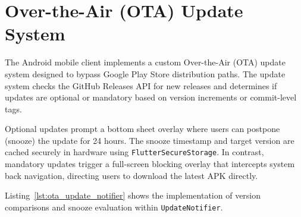 \section{Over-the-Air (OTA) Update System}
The Android mobile client implements a custom Over-the-Air (OTA) update system designed to bypass Google Play Store distribution paths. The update system checks the GitHub Releases API for new releases and determines if updates are optional or mandatory based on version increments or commit-level tags.

Optional updates prompt a bottom sheet overlay where users can postpone (snooze) the update for 24 hours. The snooze timestamp and target version are cached securely in hardware using \texttt{FlutterSecureStorage}. In contrast, mandatory updates trigger a full-screen blocking overlay that intercepts system back navigation, directing users to download the latest APK directly.

Listing~\ref{lst:ota_update_notifier} shows the implementation of version comparisons and snooze evaluation within \texttt{UpdateNotifier}.

